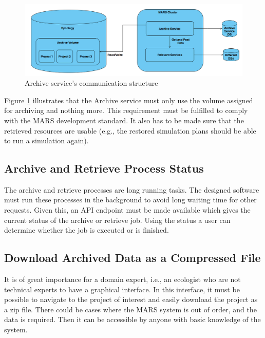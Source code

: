             \begin{figure}[H]
                \centering \includegraphics[scale=0.4]{grafiken/synology.png}
                \caption{Archive service's communication structure}
                \label{fig:synology}
            \end{figure}

            Figure \ref{fig:synology} illustrates that the Archive service must only use the volume assigned for archiving and nothing more. 
            This requirement must be fulfilled to comply with the MARS development standard. It also has to be made sure that the retrieved
            resources are usable (e.g., the restored simulation plans should be able to run a simulation again). 

        \subsection{Archive and Retrieve Process Status}  
            The archive and retrieve processes are long running tasks. The designed software must run these processes in the background to avoid 
            long waiting time for other requests. Given this, an API endpoint must be made available which gives the current status of the archive 
            or retrieve job. Using the status a user can determine whether the job is executed or is finished.


        \subsection{Download Archived Data as a Compressed File}
        \label{sec:anaCompress}
            It is of great importance for a domain expert, i.e., an ecologist who are not technical experts to have a graphical interface. In this interface,
            it must be possible to navigate to the project of interest and easily download the project as a zip file. There could be cases where the
            MARS system is out of order, and the data is required. Then it can be accessible by anyone with basic knowledge of the system.
        
